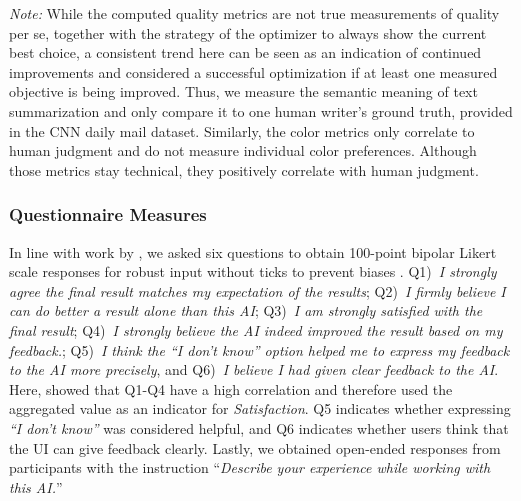 \documentclass[acmsmall,screen,nonacm]{acmart}
\begin{document}
\emph{Note:} While the computed quality metrics are not true measurements of quality per se, together with the strategy of the optimizer to always show the current best choice, a consistent trend here can be seen as an indication of continued improvements and considered a successful optimization if at least one measured objective is being improved. Thus, we measure the semantic meaning of text summarization and only compare it to one human writer's ground truth, provided in the CNN daily mail dataset. Similarly, the color metrics only correlate to human judgment and do not measure individual color preferences. Although those metrics stay technical, they positively correlate with human judgment.

\subsubsection{Questionnaire Measures}
\label{sec:questionnaire-measures}
In line with work by \citet{ou2023expertise}, we asked six questions to obtain 100-point bipolar Likert scale responses for robust input \citep{funke2012why} without ticks to prevent biases \citep{matejka2016effect}. Q1)~\textit{I strongly agree the final result matches my expectation of the results}; Q2)~\textit{I firmly believe I can do better a result alone than this AI}; Q3)~\textit{I am strongly satisfied with the final result}; Q4)~\textit{I strongly believe the AI indeed improved the result based on my feedback.}; Q5)~\textit{I think the ``I don't know'' option helped me to express my feedback to the AI more precisely}, and Q6)~\textit{I believe I had given clear feedback to the AI}. Here, \citet{ou2023expertise} showed that Q1-Q4 have a high correlation and therefore used the aggregated value as an indicator for \emph{Satisfaction}. Q5 indicates whether expressing \emph{``I don't know''} was considered helpful, and Q6 indicates whether users think that the UI can give feedback clearly. Lastly, we obtained open-ended responses from participants with the instruction ``\textit{Describe your experience while working with this AI.}''
\end{document}
